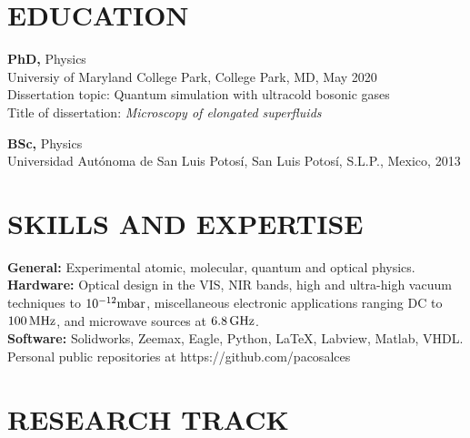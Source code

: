 \documentclass[margin]{res} %
\begin{document}
\begin{resume}


\section{EDUCATION}

{\bf PhD,} Physics \\
Universiy of Maryland College Park, College Park, MD, May 2020 \\
Dissertation topic: Quantum simulation with ultracold bosonic gases\\
Title of dissertation: {\it Microscopy of elongated superfluids}

{\bf BSc,} Physics \\
Universidad Aut\'onoma de San Luis Potos\'i, San Luis Potos\'i, S.L.P., Mexico, 2013
 

\section{SKILLS AND EXPERTISE}

{\bf General:}
Experimental atomic, molecular, quantum and optical physics.\\
{\bf Hardware:}
Optical design in the VIS, NIR bands, high and ultra-high vacuum techniques to ${10^{-12} {\rm mbar}}$, miscellaneous electronic applications ranging DC to ${100 \, {\rm MHz}}$, and microwave sources at$~6.8\,{\rm GHz}$.\\
{\bf Software:}
Solidworks, Zeemax, Eagle, Python, \LaTeX, Labview, Matlab, VHDL. Personal public repositories at https://github.com/pacosalces

 
\section{RESEARCH TRACK}


\end{resume}
\end{document}
